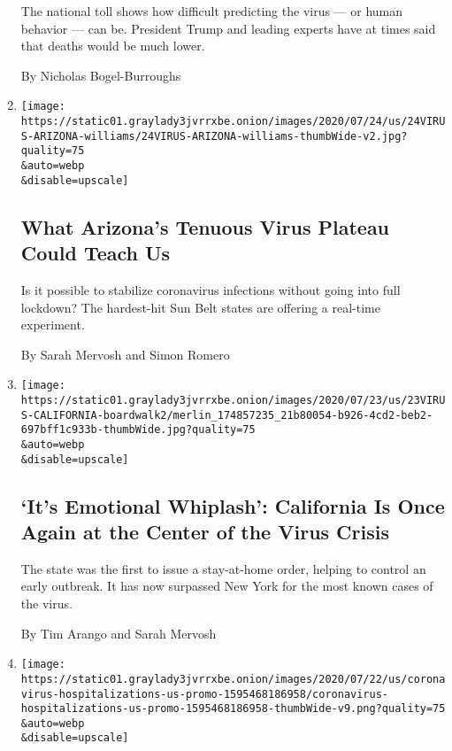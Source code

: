 \begin{enumerate}
  The national toll shows how difficult predicting the virus --- or
  human behavior --- can be. President Trump and leading experts have at
  times said that deaths would be much lower.

  By Nicholas Bogel-Burroughs
\item
  \href{/2020/07/24/us/coronavirus-arizona.html}{}

  \texttt{[image: https://static01.graylady3jvrrxbe.onion/images/2020/07/24/us/24VIRUS-ARIZONA-williams/24VIRUS-ARIZONA-williams-thumbWide-v2.jpg?quality=75\\\&auto=webp\\\&disable=upscale]}

  \hypertarget{what-arizonas-tenuous-virus-plateau-could-teach-us}{%
  \subsection{What Arizona's Tenuous Virus Plateau Could Teach
  Us}\label{what-arizonas-tenuous-virus-plateau-could-teach-us}}

  Is it possible to stabilize coronavirus infections without going into
  full lockdown? The hardest-hit Sun Belt states are offering a
  real-time experiment.

  By Sarah Mervosh and Simon Romero
\item
  \href{/2020/07/23/us/california-covid-19-cases.html}{}

  \texttt{[image: https://static01.graylady3jvrrxbe.onion/images/2020/07/23/us/23VIRUS-CALIFORNIA-boardwalk2/merlin\_174857235\_21b80054-b926-4cd2-beb2-697bff1c933b-thumbWide.jpg?quality=75\\\&auto=webp\\\&disable=upscale]}

  \hypertarget{its-emotional-whiplash-california-is-once-again-at-the-center-of-the-virus-crisis}{%
  \subsection{`It's Emotional Whiplash': California Is Once Again at the
  Center of the Virus
  Crisis}\label{its-emotional-whiplash-california-is-once-again-at-the-center-of-the-virus-crisis}}

  The state was the first to issue a stay-at-home order, helping to
  control an early outbreak. It has now surpassed New York for the most
  known cases of the virus.

  By Tim Arango and Sarah Mervosh
\item
  \href{/interactive/2020/07/23/us/coronavirus-hospitalizations-us.html}{}

  \texttt{[image: https://static01.graylady3jvrrxbe.onion/images/2020/07/22/us/coronavirus-hospitalizations-us-promo-1595468186958/coronavirus-hospitalizations-us-promo-1595468186958-thumbWide-v9.png?quality=75\\\&auto=webp\\\&disable=upscale]}


\end{enumerate}
